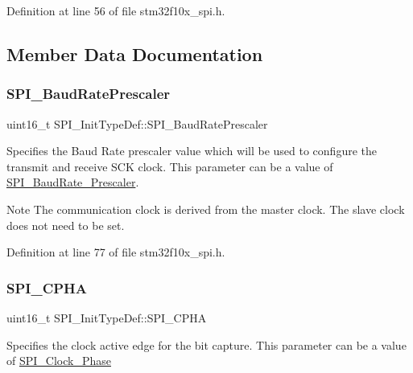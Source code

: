 Definition at line 56 of file stm32f10x\+\_\+spi.\+h.



\subsection{Member Data Documentation}
\mbox{\label{struct_s_p_i___init_type_def_adfcf6178b6a117643111c13403f32e71}} 
\subsubsection{\texorpdfstring{S\+P\+I\+\_\+\+Baud\+Rate\+Prescaler}{SPI\_BaudRatePrescaler}}
{\footnotesize\ttfamily uint16\+\_\+t S\+P\+I\+\_\+\+Init\+Type\+Def\+::\+S\+P\+I\+\_\+\+Baud\+Rate\+Prescaler}

Specifies the Baud Rate prescaler value which will be used to configure the transmit and receive S\+CK clock. This parameter can be a value of \hyperlink{group___s_p_i___baud_rate___prescaler}{S\+P\+I\+\_\+\+Baud\+Rate\+\_\+\+Prescaler}. \begin{DoxyNote}{Note}
The communication clock is derived from the master clock. The slave clock does not need to be set. 
\end{DoxyNote}


Definition at line 77 of file stm32f10x\+\_\+spi.\+h.

\mbox{\label{struct_s_p_i___init_type_def_acdaac9259c45f137e804f90122edb129}} 
\subsubsection{\texorpdfstring{S\+P\+I\+\_\+\+C\+P\+HA}{SPI\_CPHA}}
{\footnotesize\ttfamily uint16\+\_\+t S\+P\+I\+\_\+\+Init\+Type\+Def\+::\+S\+P\+I\+\_\+\+C\+P\+HA}

Specifies the clock active edge for the bit capture. This parameter can be a value of \hyperlink{group___s_p_i___clock___phase}{S\+P\+I\+\_\+\+Clock\+\_\+\+Phase} 

